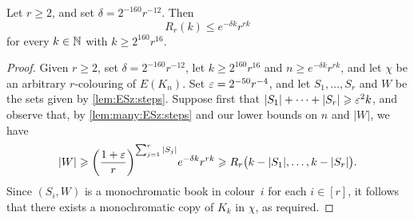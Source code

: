 \begin{theorem}
  \label{thm:Ramsey:multicolour:quant} %
  Let \(r \ge 2\), and set \(\delta = 2^{-160} r^{-12}\). Then
  \begin{equation*}
    R_r(k) \le e^{-\delta k} r^{rk}
  \end{equation*}
  for every \(k \in \mathbb{N}\) with \(k \ge 2^{160} r^{16}\). 
\end{theorem}
%
\begin{proof}
  Given \(r \ge 2\), set \(\delta = 2^{-160} r^{-12}\), let \(k \ge 2^{160} r^{16}\) and \(n \ge e^{-\delta k} r^{rk}\), and let \(\chi\) be an arbitrary \(r\)-colouring of \(E(K_n)\). Set \(\varepsilon = 2^{-50} r^{-4}\), and let \(S_1,\ldots,S_r\) and \(W\) be the sets given by \autoref{lem:ESz:steps}. Suppose first that \(|S_1| + \cdots + |S_r| \geqslant \varepsilon^2 k\), and observe that, by \autoref{lem:many:ESz:steps} and our lower bounds on \(n\) and \(|W|\), we have 
  \begin{equation*}
    |W| \geqslant \bigg( \frac{1+\varepsilon}{r} \bigg)^{\sum_{j = 1}^r |S_j|} e^{-\delta k} r^{rk} \geqslant R_r\big( k - |S_1|, \ldots, k - |S_r| \big).
  \end{equation*}
  Since \((S_i,W)\) is a monochromatic book in colour~\(i\) for each \(i \in [r]\), it follows that there exists a monochromatic copy of \(K_k\) in \(\chi\), as required.
  

\end{proof}
